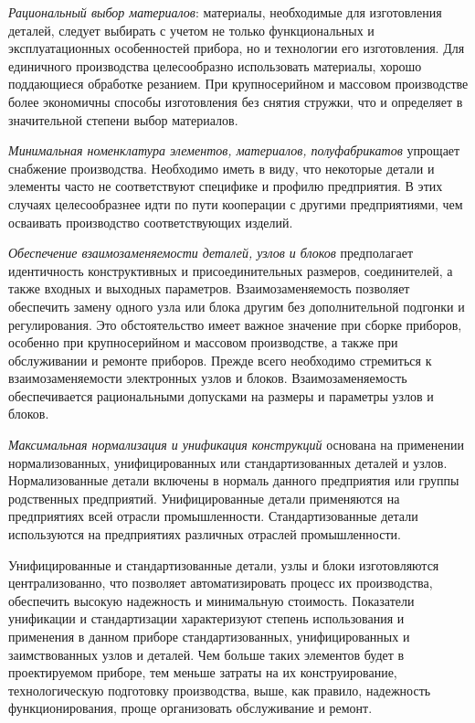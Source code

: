 \textit{Рациональный выбор материалов}: материалы, необходимые для изготовления деталей, следует выбирать с учетом не только функциональных и эксплуатационных особенностей прибора, но и технологии его изготовления. Для единичного производства целесообразно использовать материалы, хорошо поддающиеся обработке резанием. При крупносерийном и массовом производстве более экономичны способы изготовления без снятия стружки, что и определяет в значительной степени выбор материалов.

\textit{Минимальная номенклатура элементов, материалов, полуфабрикатов} упрощает снабжение производства. 
Необходимо иметь в виду, что некоторые детали и элементы часто не соответствуют специфике и профилю предприятия. 
В этих случаях целесообразнее идти по пути кооперации с другими предприятиями, чем осваивать производство соответствующих изделий.

\textit{Обеспечение взаимозаменяемости деталей, узлов и блоков} предполагает идентичность конструктивных и присоединительных размеров, соединителей, а также входных и выходных параметров. Взаимозаменяемость позволяет обеспечить замену одного узла или блока другим без дополнительной подгонки и регулирования. 
Это обстоятельство имеет важное значение при сборке приборов, особенно при крупносерийном и массовом производстве, а также при обслуживании и ремонте приборов. 
Прежде всего необходимо стремиться к взаимозаменяемости электронных узлов и блоков. 
Взаимозаменяемость обеспечивается рациональными допусками на размеры и параметры узлов и блоков.

\textit{Максимальная нормализация и унификация конструкций} основана на применении нормализованных, унифицированных или стандартизованных деталей и узлов. 
Нормализованные детали включены в нормаль данного предприятия или группы родственных предприятий. 
Унифицированные детали применяются на предприятиях всей отрасли промышленности. 
Стандартизованные детали используются на предприятиях различных отраслей промышленности.

Унифицированные и стандартизованные детали, узлы и блоки изготовляются централизованно, что позволяет автоматизировать процесс их производства, обеспечить высокую надежность и минимальную стоимость. 
Показатели унификации и стандартизации характеризуют степень использования и применения в данном приборе стандартизованных, унифицированных и заимствованных узлов и деталей. 
Чем больше таких элементов будет в проектируемом приборе, тем меньше затраты на их конструирование, технологическую подготовку производства, выше, как правило, надежность функционирования, проще организовать обслуживание и ремонт.

